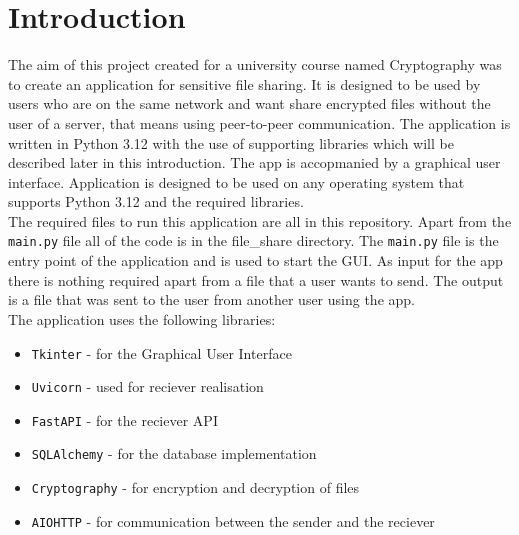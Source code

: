 \section{Introduction}
The aim of this project created for a university course named Cryptography was to create an application for sensitive file sharing. It is designed to be used by 
users who are on the same network and want share encrypted files without the user of a server, that means using peer-to-peer communication. The application is
written in Python 3.12 with the use of supporting libraries which will be described later in this introduction. The app is accopmanied by a graphical user
interface. Application is designed to be used on any operating system that supports Python 3.12 and the required libraries. \\

The required files to run this application are all in this repository. Apart from the \texttt{main.py} file all of the code is in the file\_share directory.
The \texttt{main.py} file is the entry point of the application and is used to start the GUI. As input for the app there is nothing required apart from a file
that a user wants to send. The output is a file that was sent to the user from another user using the app. \\

The application uses the following libraries:
\begin{itemize}
    \item \texttt{Tkinter} - for the Graphical User Interface
    \item \texttt{Uvicorn} - used for reciever realisation
    \item \texttt{FastAPI} - for the reciever API
    \item \texttt{SQLAlchemy} - for the database implementation
    \item \texttt{Cryptography} - for encryption and decryption of files
    \item \texttt{AIOHTTP} - for communication between the sender and the reciever
\end{itemize}